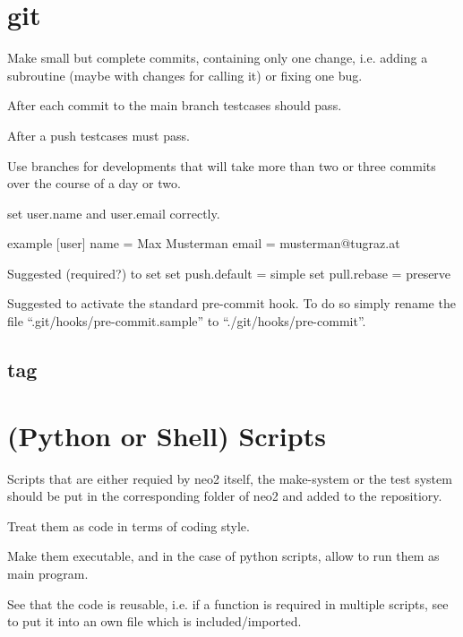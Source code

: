 \documentclass{article}
\begin{document}
\section{git}

Make small but complete commits, containing only one change, i.e. adding
a subroutine (maybe with changes for calling it) or fixing one bug.

After each commit to the main branch testcases should pass.

After a push testcases must pass.

Use branches for developments that will take more than two or three
commits over the course of a day or two.

set user.name and user.email correctly.

example
[user]
  name = Max Musterman
  email = musterman@tugraz.at

Suggested (required?) to set
set push.default = simple
set pull.rebase = preserve

Suggested to activate the standard pre-commit hook. To do so simply
rename the file ``.git/hooks/pre-commit.sample'' to
``./git/hooks/pre-commit''.

\subsection{tag}

\section{(Python or Shell) Scripts}
Scripts that are either requied by neo2 itself, the make-system or the
test system should be put in the corresponding folder of neo2 and added
to the repositiory.

Treat them as code in terms of coding style.

Make them executable, and in the case of python scripts, allow to run
them as main program.

See that the code is reusable, i.e. if a function is required in
multiple scripts, see to put it into an own file which is
included/imported.
\end{document}
